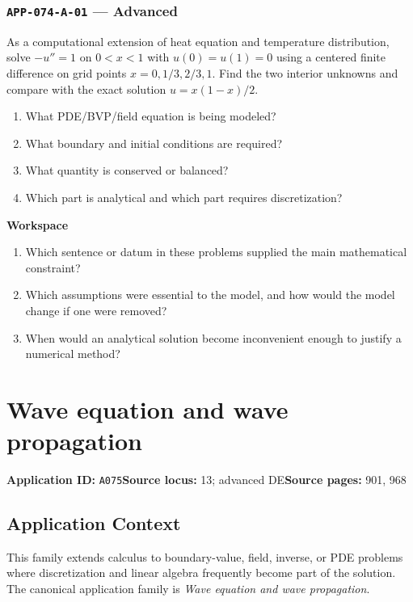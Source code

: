 \documentclass[11pt]{book}
\newcommand{\pid}[1]{\texttt{#1}}
\newcommand{\workspace}{\par\vspace{0.7in}\hrulefill\par\vspace{0.55in}\hrulefill\par}
\begin{document}
\subsection*{\pid{APP-074-A-01} — Advanced}
\begin{problembox}
As a computational extension of heat equation and temperature distribution, solve $-u''=1$ on $0<x<1$ with $u(0)=u(1)=0$ using a centered finite difference on grid points $x=0,1/3,2/3,1$. Find the two interior unknowns and compare with the exact solution $u=x(1-x)/2$.
\end{problembox}
\begin{promptbox}\begin{enumerate}
\item What PDE/BVP/field equation is being modeled?
\item What boundary and initial conditions are required?
\item What quantity is conserved or balanced?
\item Which part is analytical and which part requires discretization?
\end{enumerate}\end{promptbox}
\textbf{Workspace}\workspace
\begin{reflectionbox}\begin{enumerate}
\item Which sentence or datum in these problems supplied the main mathematical constraint?
\item Which assumptions were essential to the model, and how would the model change if one were removed?
\item When would an analytical solution become inconvenient enough to justify a numerical method?
\end{enumerate}\end{reflectionbox}
\chapter{Wave equation and wave propagation}\label{app:A075}
\textbf{Application ID:} \pid{A075}\quad \textbf{Source locus:} 13; advanced DE\quad \textbf{Source pages:} 901, 968
\section*{Application Context}
This family extends calculus to boundary-value, field, inverse, or PDE problems where discretization and linear algebra frequently become part of the solution. The canonical application family is \emph{Wave equation and wave propagation}.
\end{document}
